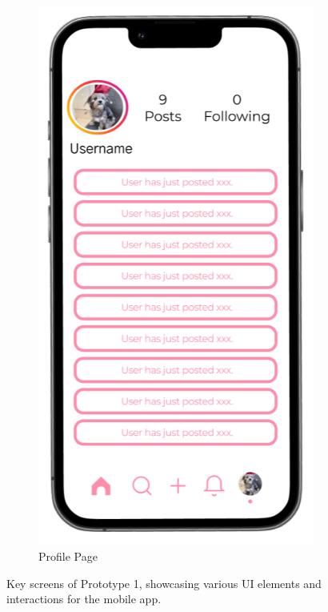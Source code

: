 \begin{figure}[!htbp]
\begin{subfigure}[b]{0.3\textwidth}
    \includegraphics[width=\textwidth]{Figures/profile.png}
    \caption{Profile Page}
    \label{fig:profile}
  \end{subfigure}
  \caption{Key screens of Prototype 1, showcasing various UI elements and interactions for the mobile app.}
  \label{fig:prototype1_screens_2}
\end{figure}
